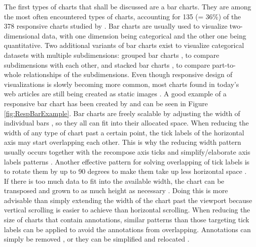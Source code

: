 The first types of charts that shall be discussed are a bar charts. They are among the most often encountered types of charts, accounting for 135 (= 36\%) of the 378 responsive charts studied by \cite{DesignPatternsTradeOffsRespVis}. Bar charts are usually used to visualize two-dimensional data, with one dimension being categorical and the other one being quantitative. Two additional variants of bar charts exist to visualize categorical datasets with multiple subdimensions: grouped bar charts \parencite{GroupedBar}, to compare subdimensions with each other, and stacked bar charts \parencite{StackedBar}, to compare part-to-whole relationships of the subdimensions. Even though responsive design of visualizations is slowly becoming more common, most charts found in today's web articles are still being created as static images \parencite{HBar,VBar,HVBar,MapBarLine}. A good example of a responsive bar chart has been created by \cite{RespVis} and can be seen in Figure \ref{fig:RespBarExample}. Bar charts are freely scalable by adjusting the width of individual bars \parencite{RespHBar,RespHBarHLine,RespHBars}, so they all can fit into their allocated space. When reducing the width of any type of chart past a certain point, the tick labels of the horizontal axis may start overlapping each other. This is why the reducing width pattern usually occurs together with the recompose axis ticks and simplify/elaborate axis labels patterns \parencite{RespHBars,RespHBarHLine,RespVBar}. Another effective pattern for solving overlapping of tick labels is to rotate them by up to 90 degrees to make them take up less horizontal space \parencite{RespVis}. If there is too much data to fit into the available width, the chart can be transposed and grown to as much height as necessary \parencite{RespVis}. Doing this is more advisable than simply extending the width of the chart past the viewport because vertical scrolling is easier to achieve than horizontal scrolling. When reducing the size of charts that contain annotations, similar patterns than those targeting tick labels can be applied to avoid the annotations from overlapping. Annotations can simply be removed \parencite{RespHStackedBar,RespHLineHStackedBar}, or they can be simplified and relocated \parencite{RespVBar}.


